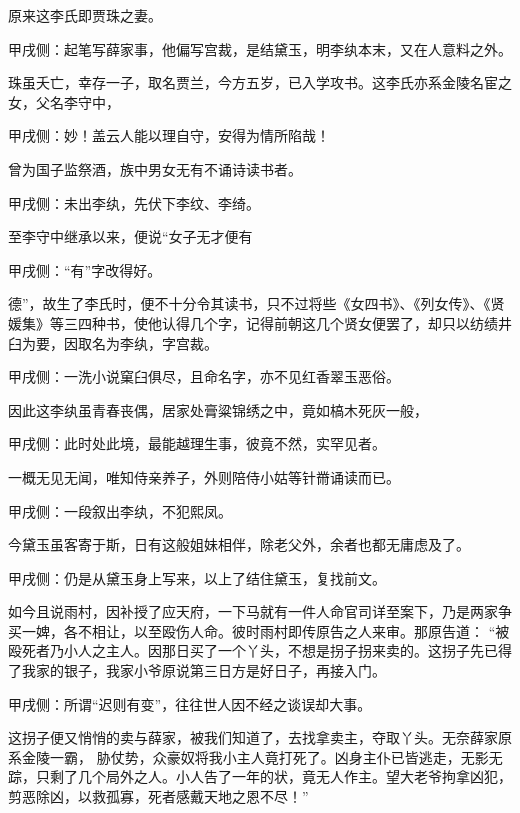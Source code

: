 \begin{parag}
    原来这李氏即贾珠之妻。\begin{note}甲戌侧：起笔写薛家事，他偏写宫裁，是结黛玉，明李纨本末，又在人意料之外。\end{note}珠虽夭亡，幸存一子，取名贾兰，今方五岁，已入学攻书。这李氏亦系金陵名宦之女，父名李守中，\begin{note}甲戌侧：妙！盖云人能以理自守，安得为情所陷哉！\end{note}曾为国子监祭酒，族中男女无有不诵诗读书者。\begin{note}甲戌侧：未出李纨，先伏下李纹、李绮。\end{note}至李守中继承以来，便说“女子无才便有\begin{note}甲戌侧：“有”字改得好。\end{note}德”，故生了李氏时，便不十分令其读书，只不过将些《女四书》、《列女传》、《贤媛集》等三四种书，使他认得几个字，记得前朝这几个贤女便罢了，却只以纺绩井臼为要，因取名为李纨，字宫裁。\begin{note}甲戌侧：一洗小说窠臼俱尽，且命名字，亦不见红香翠玉恶俗。\end{note}因此这李纨虽青春丧偶，居家处膏粱锦绣之中，竟如槁木死灰一般，\begin{note}甲戌侧：此时处此境，最能越理生事，彼竟不然，实罕见者。\end{note}一概无见无闻，唯知侍亲养子，外则陪侍小姑等针黹诵读而已。\begin{note}甲戌侧：一段叙出李纨，不犯熙凤。\end{note}今黛玉虽客寄于斯，日有这般姐妹相伴，除老父外，余者也都无庸虑及了。\begin{note}甲戌侧：仍是从黛玉身上写来，以上了结住黛玉，复找前文。\end{note}
\end{parag}


\begin{parag}
    如今且说雨村，因补授了应天府，一下马就有一件人命官司详至案下，乃是两家争买一婢，各不相让，以至殴伤人命。彼时雨村即传原告之人来审。那原告道： “被殴死者乃小人之主人。因那日买了一个丫头，不想是拐子拐来卖的。这拐子先已得了我家的银子，我家小爷原说第三日方是好日子，再接入门。\begin{note}甲戌侧：所谓“迟则有变”，往往世人因不经之谈误却大事。\end{note}这拐子便又悄悄的卖与薛家，被我们知道了，去找拿卖主，夺取丫头。无奈薛家原系金陵一霸， 胁仗势，众豪奴将我小主人竟打死了。凶身主仆已皆逃走，无影无踪，只剩了几个局外之人。小人告了一年的状，竟无人作主。望大老爷拘拿凶犯，剪恶除凶，以救孤寡，死者感戴天地之恩不尽！”
\end{parag}


